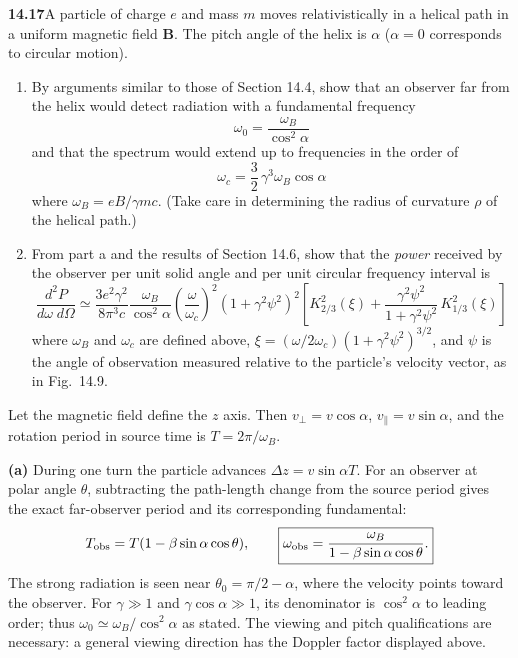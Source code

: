 \par\bigskip
\noindent\textbf{14.17}\quad A particle of charge $e$ and mass $m$ moves relativistically in a helical path in a uniform magnetic field $\mathbf{B}$. The pitch angle of the helix is $\alpha$ ($\alpha=0$ corresponds to circular motion).
\begin{enumerate}
\item[(a)] By arguments similar to those of Section 14.4, show that an observer far from the helix  would detect radiation with a fundamental frequency
\[
\omega_{0}=\frac{\omega_{B}}{\cos^{2}\alpha}
\]
and that the spectrum would extend up to frequencies in the order of
\[
\omega_{c}=\frac{3}{2}\,\gamma^{3}\omega_{B}\cos\alpha
\]
where $\omega_{B}=eB/\gamma mc$. (Take care in determining the radius of curvature $\rho$ of the helical path.)
\item[(b)] From part a and the results of Section 14.6, show that the \emph{power} received by the observer per unit solid angle and per unit circular frequency interval is
\[
\frac{d^{2}P}{d\omega\;d\Omega}\simeq\frac{3e^{2}\gamma^{2}}{8\pi^{3}c}\frac{\omega_{B}}{\cos^{2}\alpha}\left(\frac{\omega}{\omega_{c}}\right)^{2}\!(1+\gamma^{2}\psi^{2})^{2}\!\left[K_{2/3}^{2}(\xi)+\frac{\gamma^{2}\psi^{2}}{1+\gamma^{2}\psi^{2}}\,K_{1/3}^{2}(\xi)\right]
\]
where $\omega_{B}$ and $\omega_{c}$ are defined above, $\xi=(\omega/2\omega_{c})(1+\gamma^{2}\psi^{2})^{3/2}$, and $\psi$ is the angle of observation measured relative to the particle's velocity vector, as in Fig.~14.9.
\end{enumerate}
\solution

Let the magnetic field define the $z$ axis. Then
$v_\perp=v\cos\alpha$, $v_\parallel=v\sin\alpha$, and the rotation
period in source time is $T=2\pi/\omega_B$.

\textbf{(a)} During one turn the particle advances
$\Delta z=v\sin\alpha T$. For an observer at polar angle $\theta$,
subtracting the path-length change from the source period gives the
exact far-observer period and its corresponding fundamental:
\[
T_{\rm obs}=T(1-\beta\sin\alpha\cos\theta),\qquad
\boxed{\omega_{\rm obs}=
\frac{\omega_B}{1-\beta\sin\alpha\cos\theta}.}
\]
The strong radiation is seen near
$\theta_0=\pi/2-\alpha$, where the velocity points toward the observer.
For $\gamma\gg1$ and $\gamma\cos\alpha\gg1$, its denominator is
$\cos^2\alpha$ to leading order; thus
$\omega_0\simeq\omega_B/\cos^2\alpha$ as stated.
The viewing and pitch qualifications are necessary: a general viewing
direction has the Doppler factor displayed above.

